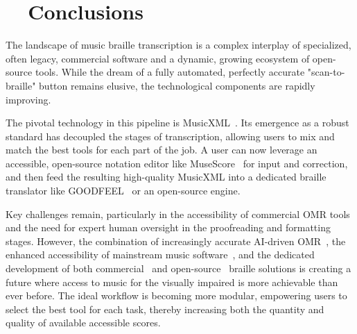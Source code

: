 \section{~~Conclusions}\label{ch10:sec:conclusions}
The landscape of music braille transcription is a complex interplay of specialized, often legacy, commercial software and a dynamic, growing ecosystem of open-source tools. While the dream of a fully automated, perfectly accurate "scan-to-braille" button remains elusive, the technological components are rapidly improving.

The pivotal technology in this pipeline is \gls{MusicXML}~\supercite{daisy-musicxml}. Its emergence as a robust standard has decoupled the stages of transcription, allowing users to mix and match the best tools for each part of the job. A user can now leverage an accessible, open-source notation editor like MuseScore~\supercite{musescore-accessibility, soundwithoutsight-musescore} for input and correction, and then feed the resulting high-quality \gls{MusicXML} into a dedicated braille translator like GOODFEEL~\supercite{dancingdots-goodfeel} or an open-source engine.

Key challenges remain, particularly in the accessibility of commercial \gls{OMR} tools and the need for expert human oversight in the proofreading and formatting stages. However, the combination of increasingly accurate AI-driven \gls{OMR}~\supercite{sachindae-polyphonic-omr, GaetanBaert-OMRdeep}, the enhanced accessibility of mainstream music software~\supercite{musescore-accessibility}, and the dedicated development of both commercial~\supercite{dancingdots-goodfeel, DuxburyDBT} and open-source~\supercite{aph-brailleblaster, musicbraillerap-github} braille solutions is creating a future where access to music for the visually impaired is more achievable than ever before. The ideal workflow is becoming more modular, empowering users to select the best tool for each task, thereby increasing both the quantity and quality of available accessible scores.
